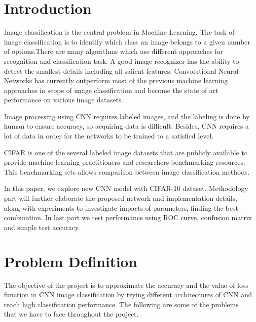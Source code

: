 \documentclass[journal,onecolumn]{IEEEtran}
\begin{document}
\section{Introduction}
%
%
%
%
\IEEEPARstart
{I}{mage} classification is the central problem in Machine Learning. The task of image classification is to identify which class an image belongs to a given number of options.There are many algorithms which use different approaches for recognition and classification task. A good image recognizer has the ability to detect the smallest details including all salient features. Convolutional Neural Networks has currently outperform most of the previous machine learning approaches in scope of image classification and become the state of art performance on various image datasets. 

Image processing using CNN requires labeled images, and the labeling is done by human to ensure accuracy, so acquiring data is difficult. Besides, CNN requires a lot of data in order for the networks to be trained to a satisfied level.

CIFAR is one of the several labeled image datasets that are publicly available to provide machine learning practitioners and researchers benchmarking resources. This benchmarking sets allows comparison between image classification methods.

In this paper, we explore new CNN model with CIFAR-10 dataset. Methodology part will further elaborate the proposed network and implementation details, along with experiments to investigate impacts of parameters, finding the best combination. In last part we test performance using ROC curve, confusion matrix and simple test accuracy.




\section{Problem Definition}
The objective of the project is to approximate the accuracy and the value of loss function in CNN image classification by trying different architectures of CNN and reach high classification performance. The following are some of the problems that we have to face throughout the project. 
\end{document}
